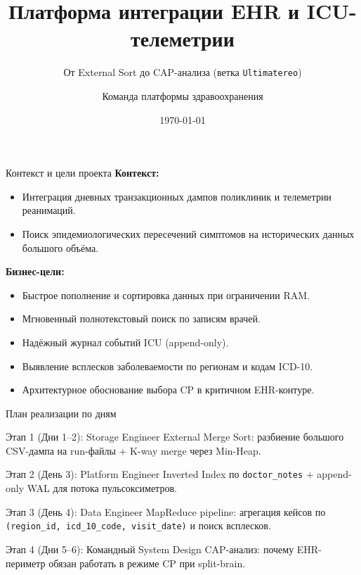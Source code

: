 \documentclass[aspectratio=169,12pt]{beamer}
\title{Платформа интеграции EHR и ICU-телеметрии}
\subtitle{От External Sort до CAP-анализа (ветка \texttt{Ultimatereo})}
\author{Команда платформы здравоохранения}
\date{\today}
\begin{document}
\begin{frame}
  \titlepage
\end{frame}

\begin{frame}{Контекст и цели проекта}
\textbf{Контекст:}
\begin{itemize}
  \item Интеграция дневных транзакционных дампов поликлиник и телеметрии реанимаций.
  \item Поиск эпидемиологических пересечений симптомов на исторических данных большого объёма.
\end{itemize}

\vspace{0.5em}
\textbf{Бизнес-цели:}
\begin{itemize}
  \item Быстрое пополнение и сортировка данных при ограничении RAM.
  \item Мгновенный полнотекстовый поиск по записям врачей.
  \item Надёжный журнал событий ICU (append-only).
  \item Выявление всплесков заболеваемости по регионам и кодам ICD-10.
  \item Архитектурное обоснование выбора CP в критичном EHR-контуре.
\end{itemize}
\end{frame}

\begin{frame}{План реализации по дням}
\small
\begin{block}{Этап 1 (Дни 1--2): Storage Engineer}
External Merge Sort: разбиение большого CSV-дампа на run-файлы + K-way merge через Min-Heap.
\end{block}

\begin{block}{Этап 2 (День 3): Platform Engineer}
Inverted Index по \texttt{doctor\_notes} + append-only WAL для потока пульсоксиметров.
\end{block}

\begin{block}{Этап 3 (День 4): Data Engineer}
MapReduce pipeline: агрегация кейсов по \texttt{(region\_id, icd\_10\_code, visit\_date)} и поиск всплесков.
\end{block}

\begin{block}{Этап 4 (Дни 5--6): Командный System Design}
CAP-анализ: почему EHR-периметр обязан работать в режиме CP при split-brain.
\end{block}
\end{frame}
\end{document}
